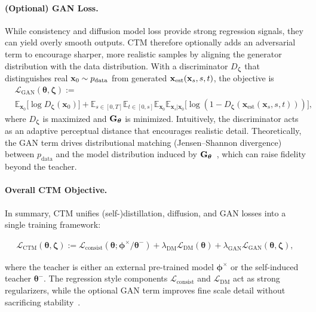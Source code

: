 \paragraph{(Optional) GAN Loss.}
While consistency and diffusion model loss provide strong regression signals, they can yield
overly smooth outputs. CTM therefore optionally adds an adversarial term to
encourage sharper, more realistic samples by aligning the generator
distribution with the data distribution. With a discriminator
$D_{\bm{\zeta}}$ that distinguishes real ${\mathbf{x}}_{0}\sim p_{\mathrm{data}}$ from
generated ${\mathbf{x}}_{\mathrm{est}}({\mathbf{x}}_{s},s,t)$, the objective is
\begin{align*} 
&\mathcal{L}_{\mathrm{GAN}}(\bm{\theta}, \bm{\zeta}) := \\ &\mathbb{E}_{\mathbf{x}_0} \big[\log D_{\bm{\zeta}}(\mathbf{x}_0)\big] + \mathbb{E}_{s \in [0, T]} \mathbb{E}_{t \in [0, s]} \mathbb{E}_{\mathbf{x}_0} \mathbb{E}_{\mathbf{x}_s \vert \mathbf{x}_0} \big[\log (1 - D_{\bm{\zeta}}( \mathbf{x}_{\mathrm{est}}(\mathbf{x}_s, s, t)))\big], \end{align*}
where $D_{\bm{\zeta}}$ is maximized and ${\mathbf{G}}_{\bm{\theta}}$ is minimized.
Intuitively, the discriminator acts as an adaptive perceptual distance that
encourages realistic detail. Theoretically, the GAN term drives distributional
matching (Jensen–Shannon divergence) between $p_{\mathrm{data}}$ and the model
distribution induced by ${\mathbf{G}}_{\bm{\theta}}$~\citep{goodfellow2014generative},
which can raise fidelity beyond the teacher.

\paragraph{Overall CTM Objective.}
In summary, CTM unifies (self-)distillation, diffusion, and GAN losses into a single training framework:
\begin{mdframed}
    \begin{align*}
\mathcal{L}_{\mathrm{CTM}}(\bm{\theta},\bm{\zeta})
:=  \mathcal{L}_{\mathrm{consist}}(\bm{\theta};  \bm{\phi}^\times/\bm{\theta}^-)
+ \lambda_{\mathrm{DM}} \mathcal{L}_{\mathrm{DM}}(\bm{\theta})
+ \lambda_{\mathrm{GAN}} \mathcal{L}_{\mathrm{GAN}}(\bm{\theta},\bm{\zeta}),
\end{align*}
\end{mdframed}
where the teacher is either an external pre-trained model $\bm{\phi}^\times$ or
the self-induced teacher $\bm{\theta}^-$. The regression style components
$\mathcal{L}_{\mathrm{consist}}$ and $\mathcal{L}_{\mathrm{DM}}$ act as strong
regularizers, while the optional GAN term improves fine scale detail without
sacrificing stability~\citep{kim2024pagoda}.


